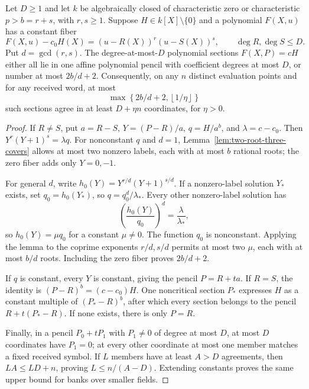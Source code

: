 \begin{theorem}
\label{thm:two-root-constant-fiber}
Let $D\ge1$ and let $k$ be algebraically closed of characteristic zero or
characteristic $p>b=r+s$, with $r,s\ge1$. Suppose $H\in k[X]\setminus\{0\}$ and a polynomial
$F(X,u)$ has a constant fiber
\[
 F(X,u)-c_0H(X)=(u-R(X))^r(u-S(X))^s,
 \qquad \deg R,\deg S\le D.
\]
Put $d=\gcd(r,s)$. The degree-at-most-$D$ polynomial sections
$F(X,P)=cH$ either all lie in one affine polynomial pencil with
coefficient degrees at most $D$, or number at most $2b/d+2$.
Consequently, on any $n$ distinct evaluation points and for any received
word, at most
\[
 \max\left\{2b/d+2,\left\lfloor1/\eta\right\rfloor\right\}
\]
such sections agree in at least $D+\eta n$ coordinates, for $\eta>0$.
\end{theorem}
\begin{proof}
If $R\ne S$, put $a=R-S$, $Y=(P-R)/a$, $q=H/a^b$, and
$\lambda=c-c_0$. Then $Y^r(Y+1)^s=\lambda q$.
For nonconstant $q$ and $d=1$, Lemma~\ref{lem:two-root-three-covers}
allows at most two nonzero labels, each with at most $b$ rational
roots; the zero fiber adds only $Y=0,-1$.

For general $d$, write $h_0(Y)=Y^{r/d}(Y+1)^{s/d}$.
If a nonzero-label solution $Y_*$ exists, set $q_0=h_0(Y_*)$,
so $q=q_0^d/\lambda_*$. Every other nonzero-label solution has
\[
 \left(\frac{h_0(Y)}{q_0}\right)^d=\frac\lambda{\lambda_*},
\]
so $h_0(Y)=\mu q_0$ for a constant $\mu\ne0$.
The function $q_0$ is nonconstant. Applying the lemma to the coprime
exponents $r/d,s/d$ permits at most two $\mu$, each with at most
$b/d$ roots. Including the zero fiber proves $2b/d+2$.

If $q$ is constant, every $Y$ is constant, giving the pencil
$P=R+ta$. If $R=S$, the identity is
$(P-R)^b=(c-c_0)H$. One noncritical section $P_*$ expresses $H$
as a constant multiple of $(P_*-R)^b$, after which every section
belongs to the pencil $R+t(P_*-R)$. If none exists, there is only
$P=R$.

Finally, in a pencil $P_0+tP_1$ with $P_1\ne0$ of degree at most
$D$, at most $D$ coordinates have $P_1=0$; at every other coordinate
at most one member matches a fixed received symbol. If $L$ members
have at least $A>D$ agreements, then $LA\le LD+n$, proving
$L\le n/(A-D)$. Extending constants proves the same upper bound
for banks over smaller fields.
\end{proof}
